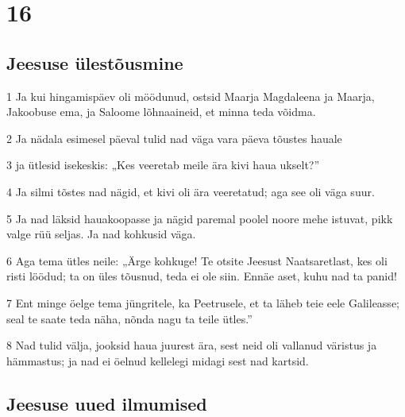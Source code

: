 \chapter{16}

\section*{Jeesuse ülestõusmine}

\par 1 Ja kui hingamispäev oli möödunud, ostsid Maarja Magdaleena ja Maarja, Jakoobuse ema, ja Saloome lõhnaaineid, et minna teda võidma.
\par 2 Ja nädala esimesel päeval tulid nad väga vara päeva tõustes hauale
\par 3 ja ütlesid isekeskis: „Kes veeretab meile ära kivi haua ukselt?”
\par 4 Ja silmi tõstes nad nägid, et kivi oli ära veeretatud; aga see oli väga suur.
\par 5 Ja nad läksid hauakoopasse ja nägid paremal poolel noore mehe istuvat, pikk valge rüü seljas. Ja nad kohkusid väga.
\par 6 Aga tema ütles neile: „Ärge kohkuge! Te otsite Jeesust Naatsaretlast, kes oli risti löödud; ta on üles tõusnud, teda ei ole siin. Ennäe aset, kuhu nad ta panid!
\par 7 Ent minge öelge tema jüngritele, ka Peetrusele, et ta läheb teie eele Galileasse; seal te saate teda näha, nõnda nagu ta teile ütles.”
\par 8 Nad tulid välja, jooksid haua juurest ära, sest neid oli vallanud väristus ja hämmastus; ja nad ei öelnud kellelegi midagi sest nad kartsid.

\section*{Jeesuse uued ilmumised}

